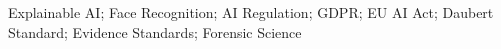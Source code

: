 \documentclass[journal]{IEEEtran}
\begin{document}
\begin{IEEEkeywords}
Explainable AI; Face Recognition; AI Regulation; GDPR; EU AI Act; Daubert Standard; Evidence Standards; Forensic Science
\end{IEEEkeywords}

\IEEEpeerreviewmaketitle













\end{document}
